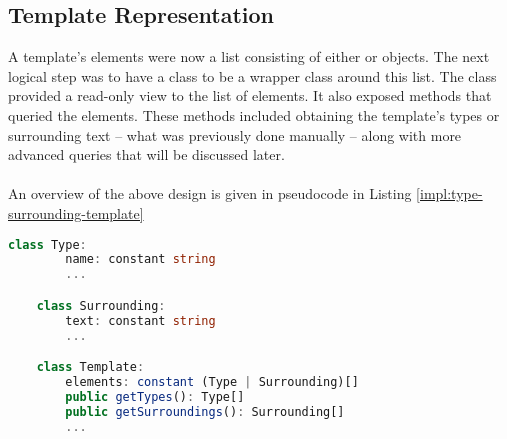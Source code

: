 \documentclass[../main.tex]{subfiles}
\begin{document}
\subsection{Template Representation}
A template's elements were now a list consisting of either  or  objects.
The next logical step was to have a  class to be a wrapper class around this list. The  class provided a read-only view to the list of elements. It also exposed methods that queried the elements. These methods included obtaining the template's types or surrounding text -- what was previously done manually -- along with more advanced queries that will be discussed later.
\\
\\
An overview of the above design is given in pseudocode in Listing \ref{impl:type-surrounding-template}
\begin{lstlisting}[language={TypeScript}, label={impl:type-surrounding-template}, caption={An overview of the \codeword{Type}, \codeword{Surrounding} and \codeword{Template} classes.}]
    class Type:
        name: constant string
        ...

    class Surrounding:
        text: constant string
        ...

    class Template:
        elements: constant (Type | Surrounding)[]
        public getTypes(): Type[]
        public getSurroundings(): Surrounding[]
        ...
\end{lstlisting}
\end{document}
